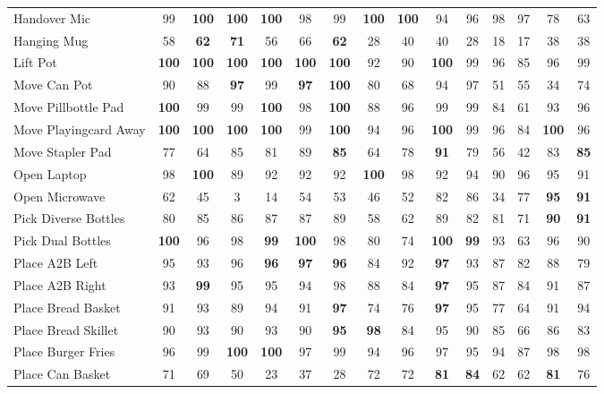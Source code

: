 \begin{table}[t]
{\begin{tabular}{lcc|cc|cc|cc|cc|cc|cc}
Handover Mic & 99 & \textbf{100} & \textbf{100} & \textbf{100} & 98 & 99 & \textbf{100} & \textbf{100} & 94 & 96 & 98 & 97 & 78 & 63 \\
Hanging Mug & 58 & \textbf{62} & \textbf{71} & 56 & 66 & \textbf{62} & 28 & 40 & 40 & 28 & 18 & 17 & 38 & 38 \\
Lift Pot & \textbf{100} & \textbf{100} & \textbf{100} & \textbf{100} & \textbf{100} & \textbf{100} & 92 & 90 & \textbf{100} & 99 & 96 & 85 & 96 & 99 \\
Move Can Pot & 90 & 88 & \textbf{97} & 99 & \textbf{97} & \textbf{100} & 80 & 68 & 94 & 97 & 51 & 55 & 34 & 74 \\
Move Pillbottle Pad & \textbf{100} & 99 & 99 & \textbf{100} & 98 & \textbf{100} & 88 & 96 & 99 & 99 & 84 & 61 & 93 & 96 \\
Move Playingcard Away & \textbf{100} & \textbf{100} & \textbf{100} & \textbf{100} & 99 & \textbf{100} & 94 & 96 & \textbf{100} & 99 & 96 & 84 & \textbf{100} & 96 \\
Move Stapler Pad & 77 & 64 & 85 & 81 & 89 & \textbf{85} & 64 & 78 & \textbf{91} & 79 & 56 & 42 & 83 & \textbf{85} \\
Open Laptop & 98 & \textbf{100} & 89 & 92 & 92 & 92 & \textbf{100} & 98 & 92 & 94 & 90 & 96 & 95 & 91 \\
Open Microwave & 62 & 45 & 3 & 14 & 54 & 53 & 46 & 52 & 82 & 86 & 34 & 77 & \textbf{95} & \textbf{91} \\
Pick Diverse Bottles & 80 & 85 & 86 & 87 & 87 & 89 & 58 & 62 & 89 & 82 & 81 & 71 & \textbf{90} & \textbf{91} \\
Pick Dual Bottles & \textbf{100} & 96 & 98 & \textbf{99} & \textbf{100} & 98 & 80 & 74 & \textbf{100} & \textbf{99} & 93 & 63 & 96 & 90 \\
Place A2B Left & 95 & 93 & 96 & \textbf{96} & \textbf{97} & \textbf{96} & 84 & 92 & \textbf{97} & 93 & 87 & 82 & 88 & 79 \\
Place A2B Right & 93 & \textbf{99} & 95 & 95 & 94 & 98 & 88 & 84 & \textbf{97} & 95 & 87 & 84 & 91 & 87 \\
Place Bread Basket & 91 & 93 & 89 & 94 & 91 & \textbf{97} & 74 & 76 & \textbf{97} & 95 & 77 & 64 & 91 & 94 \\
Place Bread Skillet & 90 & 93 & 90 & 93 & 90 & \textbf{95} & \textbf{98} & 84 & 95 & 90 & 85 & 66 & 86 & 83 \\
Place Burger Fries & 96 & 99 & \textbf{100} & \textbf{100} & 97 & 99 & 94 & 96 & 97 & 95 & 94 & 87 & 98 & 98 \\
Place Can Basket & 71 & 69 & 50 & 23 & 37 & 28 & 72 & 72 & \textbf{81} & \textbf{84} & 62 & 62 & \textbf{81} & 76 \\

\end{tabular}}
\end{table}
